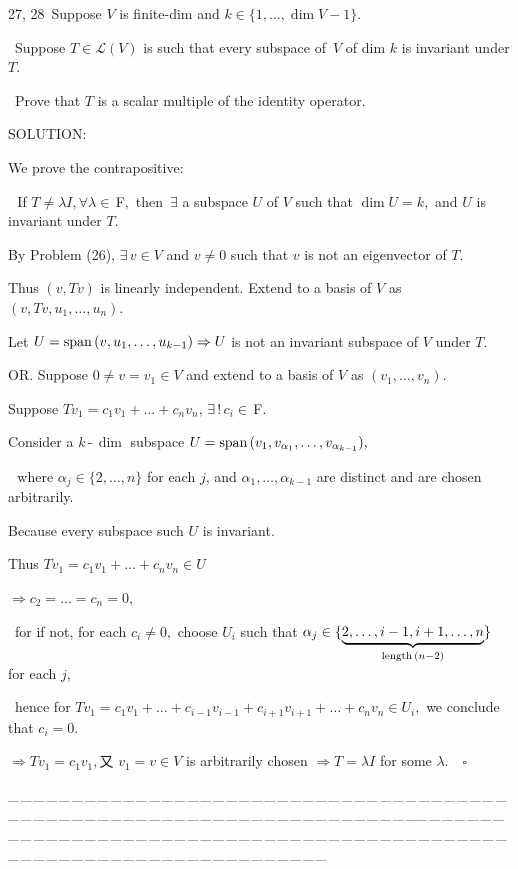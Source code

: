 \documentclass[a4paper, 11pt, UTF8]{article}
\def\Spn{\textup{span}\,}
\def\Lm{\mathcal{L}}
\def\Fbfc{$\,{\timesbf F}$}
\begin{document}
\begin{large}
{\timesbf\Large 27, 28}$\,\,\,${\timessl\Large Suppose $V$ is finite-dim and $k\in\{1, \dots , \dim V - 1\}$.}\par\qquad\quad\,
{\timessl\Large Suppose $T\in\Lm(V)$ is such that every subspace of \,$V$ of dim $k$ is invariant under $T$.}\par\qquad\quad\,
{\timessl\Large Prove that $T$ is a scalar multiple of the identity operator.}\par
{\timesbf S\footnotesize{OLUTION:}}\par\quad
We prove the contrapositive:\par\qquad\,\,
If $T\neq\lambda I,\forall\lambda\in\Fbfc,$ then $\,\exists$ a subspace $U$ of $V$ such that $\dim U=k,$ and $U$ is invariant under $T$.\par\quad
By Problem (26), $\exists\,v\in V$ and $v\neq 0$ such that $v$ is not an eigenvector of $T.$\par\quad
Thus $(v,Tv)$ is linearly independent. Extend to a basis of $V$ as $(v,Tv,u_1,\dots,u_n).$\par\quad
Let $U=\Spn(v,u_1,\dots,u_{k-1})\Rightarrow U$ is not an invariant subspace of $V$ under $T.$\par\quad
O{\small R.} Suppose $0\neq v=v_1\in V$ and extend to a basis of $V$ as $(v_1,\dots,v_n).$\par\quad
Suppose $Tv_1=c_1 v_1+\dots+c_n v_n,\,\exists\,!\,c_i\in\Fbfc.$\par\quad
Consider a $k\,$-$\,\dim$ subspace $U=\Spn(v_1,v_{\alpha_1},\dots,v_{\alpha_{k-1}}),$\par\qquad\qquad\,\,
where $\alpha_j\in\{2,\dots,n\}$ for each $j$, and $\alpha_1,\dots,\alpha_{k-1}$ are distinct and are chosen arbitrarily.\par\quad
Because every subspace such $U$ is invariant.\par\quad
Thus $Tv_1=c_1 v_1+\dots+c_n v_n\in U$\par\qquad
$\Rightarrow c_2=\dots=c_n=0,$\par\qquad\quad\, for if not, for each $c_i\neq 0,$ choose $U_i$ such that $\alpha_j\in\{\underbrace{2,\dots,i-1,i+1,\dots,n}_{\textup{length}\,(n-2)}\}$ for each $j$,\par\qquad\quad\,
hence for $Tv_1=c_1 v_1+\dots+c_{i-1}v_{i-1}+c_{i+1}v_{i+1}+\dots+c_n v_n\in U_i,$ we conclude that $c_i=0.$\par\qquad
$\Rightarrow Tv_1=c_1 v_1, $又 $v_1=v\in V$ is arbitrarily chosen $\Rightarrow T=\lambda I$ for some $\lambda.\quad\square$\par
{\tiny \_\,\_\,\_\,\_\,\_\,\_\,\_\,\_\,\_\,\_\,\_\,\_\,\_\,\_\,\_\,\_\,\_\,\_\,\_\,\_\,\_\,\_\,\_\,\_\,\_\,\_\,\_\,\_\,\_\,\_\,\_\,\_\,\_\,\_\,\_\,\_\,\_\,\_\,\_\,\_\,\_\,\_\,\_\,\_\,\_\,\_\,\_\,\_\,\_\,\_\,\_\,\_\,\_\,\_\,\_\,\_\,\_\,\_\,\_\,\_\,\_\,\_\,\_\,\_\,\_\,\_\,\_\,\_\,\_\,\_\,\_\_\,\_\,\_\,\_\,\_\,\_\,\_\,\_\,\_\,\_\,\_\,\_\,\_\,\_\,\_\,\_\,\_\,\_\,\_\,\_\,\_\,\_\,\_\,\_\,\_\,\_\,\_\,\_\,\_\,\_\,\_\,\_\,\_\,\_\,\_\,\_\,\_\,\_\,\_\,\_\,\_\,\_\,\_\,\_\,\_\,\_\,\_\,\_\,\_\,\_\,\_\,\_\,\_\,\_\,\_\,\_\,\_\,\_\,\_\,\_\,\_\,\_\,\_\,\_\,\_\,\_\,\_\,\_\,\_\,\_\,\_}\par


\end{large}
\end{document}
